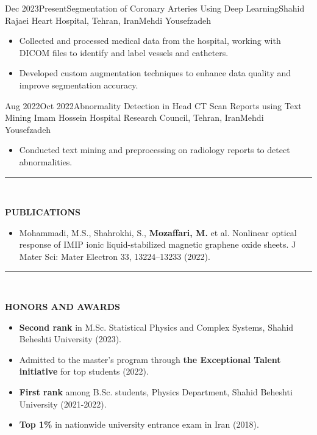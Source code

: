 \documentclass[11pt, b4paper]{cv}
\begin{document}
\begin{research_exp}{Dec 2023}{Present}{Segmentation of Coronary Arteries Using Deep Learning}{Shahid Rajaei Heart Hospital, Tehran, Iran}{Mehdi Yousefzadeh}
	\begin{itemize}
        \item Collected and processed medical data from the hospital, working with DICOM files to identify and label vessels and catheters.
        \item Developed custom augmentation techniques to enhance data quality and improve segmentation accuracy.	\end{itemize}
	
\end{research_exp}
\vspace{-0.1in}

\begin{research_exp}{Aug 2022}{Oct 2022}{Abnormality Detection in Head CT Scan Reports using Text Mining
	}{Imam Hossein Hospital Research Council, Tehran, Iran}{Mehdi Yousefzadeh}
	
	\begin{itemize}
		\item Conducted text mining and preprocessing on radiology reports to detect abnormalities.
	\end{itemize}
\end{research_exp}
    

\vspace{-0.15in}
\rule{\textwidth}{1pt}\\
\vspace{-0.15in}

\textbf{PUBLICATIONS}
\vspace{-0.10in}

\begin{itemize}
	\item 	Mohammadi, M.S., Shahrokhi, S., \textbf{Mozaffari, M.} et al. Nonlinear optical response of IMIP ionic
	liquid-stabilized magnetic graphene oxide sheets. J Mater Sci: Mater Electron 33, 13224–13233
	(2022).
\end{itemize}


\vspace{-0.15in}
\rule{\textwidth}{1pt}\\
\vspace{-0.15in}

\textbf{HONORS AND AWARDS}
\vspace{-0.10in}

\begin{itemize}
    \item \textbf{Second rank} in M.Sc. Statistical Physics and Complex Systems, Shahid Beheshti University (2023).
	\item Admitted to the master’s program through \textbf{the Exceptional Talent initiative} for top students (2022).
	\item \textbf{First rank} among B.Sc. students, Physics Department, Shahid Beheshti University (2021-2022).
    \item \textbf{Top 1\%} in nationwide university entrance exam in Iran (2018).
\end{itemize}
\end{document}
